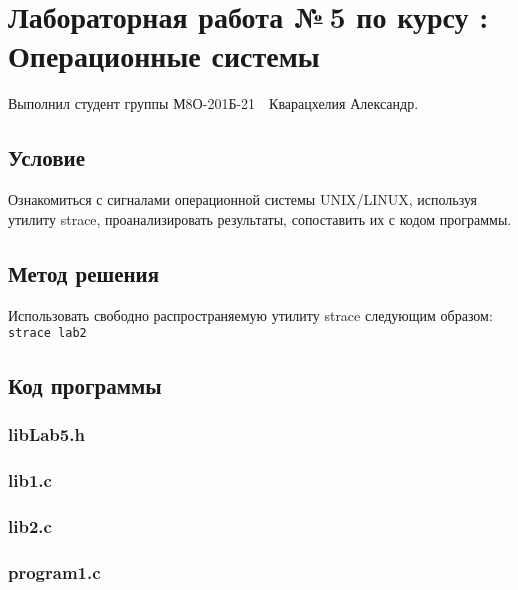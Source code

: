 \documentclass[12pt]{article}
\begin{document}
	
	\section*{\centering Лабораторная работа №\,5 по курсу :\\ Операционные системы}
	
	Выполнил студент группы М8О-201Б-21 \,\, Кварацхелия Александр.
	
	\subsection*{Условие}
	
	Ознакомиться с сигналами операционной системы UNIX/LINUX, используя утилиту strace, проанализировать результаты, сопоставить их с кодом программы.
	
	
	\subsection*{Метод решения}
	
	Использовать свободно распространяемую утилиту strace следующим образом: \\
	\lstinline[]|strace lab2|
	
	\subsection*{Код программы}
	
	\subsubsection*{libLab5.h}
	
	
	
	\subsubsection*{lib1.c}
	
	
	
	\subsubsection*{lib2.c}
	
	
	
	\subsubsection*{program1.c}
	
\end{document}
